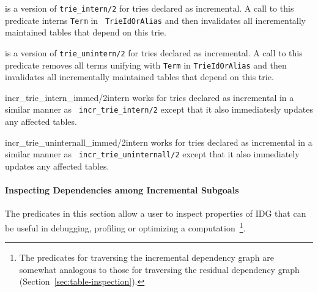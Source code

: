 \begin{description}
%
is a version of {\tt trie\_intern/2} for tries declared as
incremental.  A call to this predicate interns {\tt Term} in {\tt
  TrieIdOrAlias} and then invalidates all incrementally maintained
tables that depend on this trie.

%
is a version of {\tt trie\_unintern/2} for tries declared as
incremental.  A call to this predicate removes all terms unifying with
{\tt Term} in {\tt TrieIdOrAlias} and then invalidates all
incrementally maintained tables that depend on this trie.

           {incr\_trie\_intern\_immed/2}{intern}
%
works for tries declared as incremental in a similar manner as {\tt
  incr\_trie\_intern/2} except that it also immediatesly updates any
affected tables.

{incr\_trie\_uninternall\_immed/2}{intern}
%
works for tries declared as incremental in a similar manner as {\tt
  incr\_trie\_uninternall/2} except that it also immediately updates
any affected tables.
\end{description}

\paragraph{Inspecting Dependencies among Incremental Subgoals}
%
The predicates in this section allow a user to inspect properties of
IDG that can be useful in debugging, profiling or optimizing a
computation~\footnote{The predicates for traversing the incremental
  dependency graph are somewhat analogous to those for traversing the
  residual dependency graph (Section~\ref{sec:table-inspection}).}.

